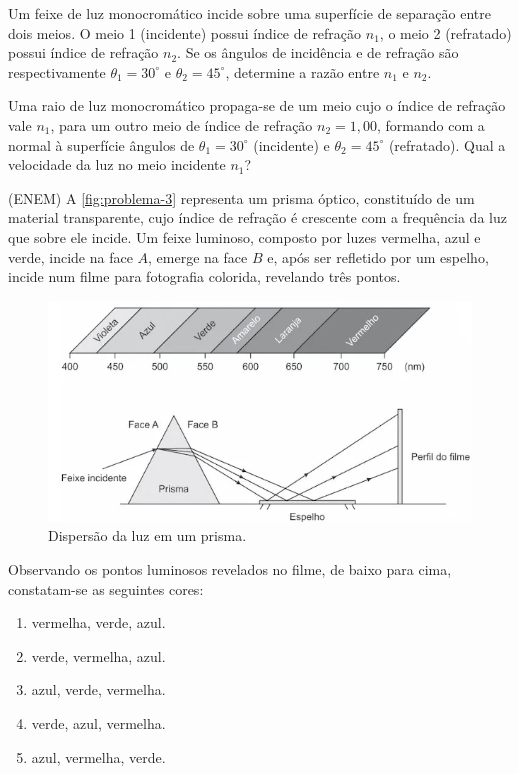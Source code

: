 \begin{prob}
    Um feixe de luz monocromático incide sobre uma superfície de separação entre dois meios. O meio 1 (incidente) possui índice de refração $n_1$, o meio 2 (refratado) possui índice de refração $n_2$. Se os ângulos de incidência e de refração são respectivamente $\theta_1=30^{\circ}$ e $\theta_2=45^{\circ}$, determine a razão entre $n_1$ e $n_2$.
\end{prob}
\begin{prob}
    Uma raio de luz monocromático propaga-se de um meio cujo o índice de refração vale $n_1$, para um outro meio de índice de refração $n_2=1,00$, formando com a normal à superfície ângulos de $\theta_1=30^{\circ}$ (incidente) e $\theta_2=45^{\circ}$ (refratado). Qual a velocidade da luz no meio incidente $n_1$?
\end{prob}
\begin{prob}(ENEM)
     A \autoref{fig:problema-3} representa um prisma óptico, constituído de um material transparente, cujo índice de refração é crescente com a frequência da luz que sobre ele incide. Um feixe luminoso, composto por luzes vermelha, azul e verde, incide na face $A$, emerge na face $B$ e, após ser refletido por um espelho, incide num filme para fotografia colorida, revelando três pontos.

    \vspace{20pt}
    \begin{figure}[ht!]
        \centering
        \includegraphics[width=.6\textwidth]{img/problema-3.png}
        \caption{Dispersão da luz em um prisma.}
        \label{fig:problema-3}                
    \end{figure}
    \vspace{20pt}
    \noindent Observando os pontos luminosos revelados no filme, de baixo para cima, constatam-se as seguintes cores:
    \begin{enumerate}[label=\alph *)]
        \item vermelha, verde, azul.
        \item verde, vermelha, azul.
        \item azul, verde, vermelha.
        \item verde, azul, vermelha.
        \item azul, vermelha, verde.
    \end{enumerate}
\end{prob}
